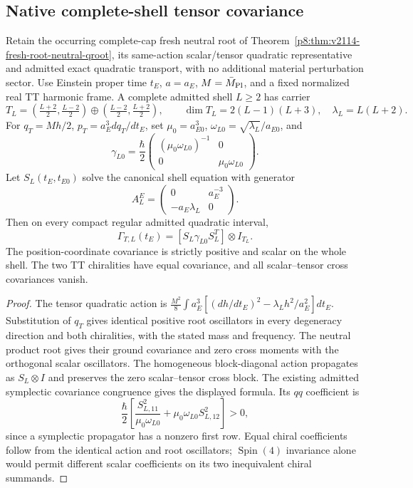 \documentclass[12pt,a4paper]{article}
\begin{document}
\subsection{Native complete-shell tensor covariance}
\label{p8:sec:native-tensor-shell-covariance}
\begin{corollary}
\label{p8:cor:native-cyclic-tensor-covariance}
Retain the occurring complete-cap fresh neutral root of
Theorem~\ref{p8:thm:v2114-fresh-root-neutral-qroot}, its same-action
scalar/tensor quadratic representative and admitted exact quadratic
transport, with no additional material perturbation sector. Use Einstein
proper time $t_E$, $a=a_E$, $M=\bar M_{\rm Pl}$, and a fixed normalized
real TT harmonic frame. A complete admitted shell $L\ge2$ has carrier
\[
 T_L=\left(\tfrac{L+2}{2},\tfrac{L-2}{2}\right)
       \oplus\left(\tfrac{L-2}{2},\tfrac{L+2}{2}\right),\qquad
 \dim T_L=2(L-1)(L+3),\quad \lambda_L=L(L+2).
\]
For $q_T=Mh/2$, $p_T=a_E^3dq_T/dt_E$, set
$\mu_0=a_{E0}^3$, $\omega_{L0}=\sqrt{\lambda_L}/a_{E0}$, and
\[
 \gamma_{L0}=\frac{\hbar}{2}
       \begin{pmatrix}(\mu_0\omega_{L0})^{-1}&0\\
                  0&\mu_0\omega_{L0}\end{pmatrix}.
\]
Let $S_L(t_E,t_{E0})$ solve the canonical shell equation with generator
\[
 A_L^E=\begin{pmatrix}0&a_E^{-3}\\-a_E\lambda_L&0\end{pmatrix}.
\]
Then on every compact regular admitted quadratic interval,
\[
 \boxed{\Gamma_{T,L}(t_E)=
       [S_L\gamma_{L0}S_L^T]\otimes I_{T_L}.}
\]
The position-coordinate covariance is strictly positive and scalar on the
whole shell. The two TT chiralities have equal covariance, and all
scalar--tensor cross covariances vanish.
\end{corollary}
\begin{proof}
The tensor quadratic action is
$\frac{M^2}{8}\int a_E^3[(dh/dt_E)^2-\lambda_Lh^2/a_E^2]dt_E$.
Substitution of $q_T$ gives identical positive root oscillators in every
degeneracy direction and both chiralities, with the stated mass and
frequency. The neutral product root gives their ground covariance and
zero cross moments with the orthogonal scalar oscillators. The homogeneous
block-diagonal action propagates as $S_L\otimes I$ and preserves the zero
scalar--tensor cross block. The existing admitted symplectic covariance
congruence gives the displayed formula. Its $qq$ coefficient is
\[
 \frac{\hbar}{2}\left[
   \frac{S_{L,11}^2}{\mu_0\omega_{L0}}
       +\mu_0\omega_{L0}S_{L,12}^2\right]>0,
\]
since a symplectic propagator has a nonzero first row. Equal chiral
coefficients follow from the identical action and root oscillators;
$\operatorname{Spin}(4)$ invariance alone would permit different scalar
coefficients on its two inequivalent chiral summands.
\end{proof}
\end{document}
